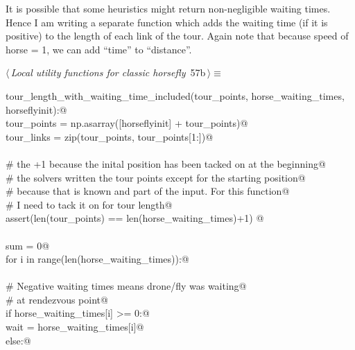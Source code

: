 \documentclass[11.5pt]{report}
\begin{document}
\vspace{-0.8cm}\newchunk It is possible that some heuristics might return non-negligible
      waiting times. Hence I am writing a separate function which
      adds the waiting time (if it is positive) to the length of 
      each link of the tour. Again note that because 
      speed of horse = 1, we can add ``time'' to ``distance''. 

\begin{flushleft} \small\label{scrap83}\raggedright\small
{} $\langle\,${\itshape Local utility functions for classic horsefly}\nobreak\ {\footnotesize {57b}}$\,\rangle\equiv$
\vspace{-1ex}
\begin{list}{}{} \item
\mbox{}\verb@def tour_length_with_waiting_time_included(tour_points, horse_waiting_times, horseflyinit):@\\
\mbox{}\verb@      tour_points   = np.asarray([horseflyinit] + tour_points)@\\
\mbox{}\verb@      tour_links    = zip(tour_points, tour_points[1:])@\\
\mbox{}\verb@@\\
\mbox{}\verb@      # the +1 because the inital position has been tacked on at the beginning@\\
\mbox{}\verb@      # the solvers written the tour points except for the starting position@\\
\mbox{}\verb@      # because that is known and part of the input. For this function@\\
\mbox{}\verb@      # I need to tack it on for tour length@\\
\mbox{}\verb@      assert(len(tour_points) == len(horse_waiting_times)+1) @\\
\mbox{}\verb@@\\
\mbox{}\verb@      sum = 0@\\
\mbox{}\verb@      for i in range(len(horse_waiting_times)):@\\
\mbox{}\verb@@\\
\mbox{}\verb@          # Negative waiting times means drone/fly was waiting@\\
\mbox{}\verb@          # at rendezvous point@\\
\mbox{}\verb@          if horse_waiting_times[i] >= 0:@\\
\mbox{}\verb@              wait = horse_waiting_times[i]@\\
\mbox{}\verb@          else:@\\

\end{list}
\end{flushleft}
\end{document}
